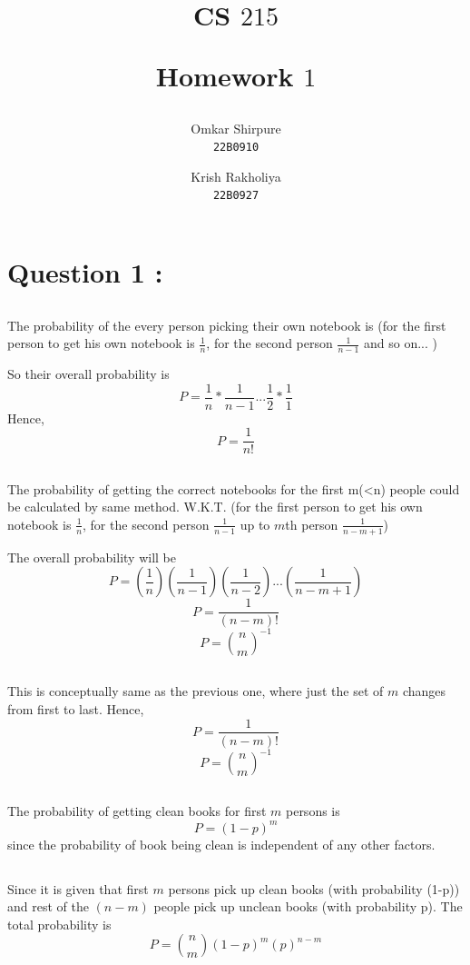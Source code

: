\documentclass[11pt,a4paper,titlepage]{article}
\title{ CS $215$ 

\blueb Homework $1$}
\author{
  Omkar Shirpure\\
  \texttt{22B0910}
  \and
  Krish Rakholiya\\
  \texttt{22B0927}
}
\date{}
\begin{document}
\maketitle

\section{Question 1 : }{
\subsection{}{
The probability of the every person picking their own notebook is (for the first person to get his own notebook is $\frac{1}{n}$, for the second person $\frac{1}{n-1}$ and so on... ) 

So their overall probability is
$$P = \frac{1}{n}*\frac{1}{n-1} ... \frac{1}{2}*\frac{1}{1}$$
Hence,
$$P = \frac{1}{n!}$$
}

\subsection{}{
The probability of getting the correct notebooks for the first m(<n) people could be calculated by same method. W.K.T. (for the first person to get his own notebook is $\frac{1}{n}$, for the second person $\frac{1}{n-1}$ up to $m$th person $\frac{1}{n-m+1}$)

\vspace{0.2cm}
The overall probability will be
$$P = (\frac{1}{n})(\frac{1}{n-1})(\frac{1}{n-2})...(\frac{1}{n-m+1})$$
$$P = \frac{1}{(n-m)!}$$
$$P = \binom{n}{m}^{-1}$$
}

\subsection{}{
This is conceptually same as the previous one, where just the set of $m$ changes from first to last.
Hence,
$$P = \frac{1}{(n-m)!}$$
$$P = \binom{n}{m}^{-1}$$
}

\subsection{}{
The probability of getting clean books for first $m$ persons is 
$$P = (1-p)^m$$
since the probability of book being clean is independent of any other factors.
}

\subsection{}{
Since it is given that first $m$ persons pick up clean books (with probability (1-p)) and rest of the $(n-m)$ people pick up unclean books (with probability p).
The total probability is 
$$P = \binom{n}{m}(1-p)^m(p)^{n-m}$$
}
\newpage
}
\end{document}
